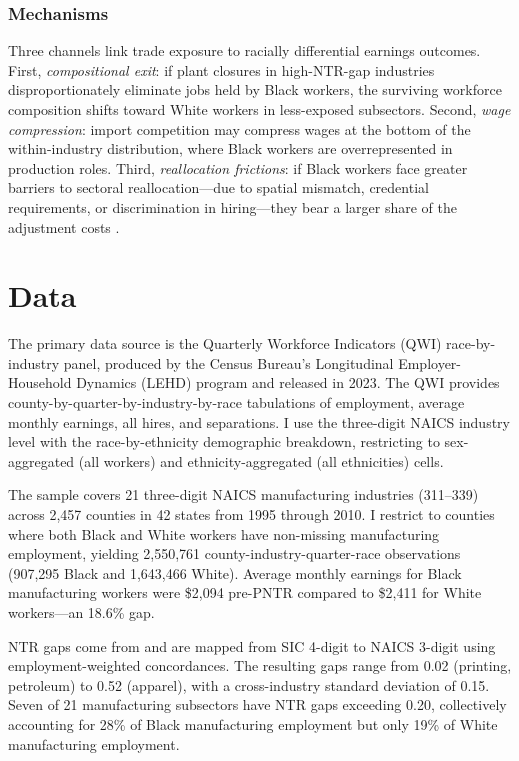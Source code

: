 \documentclass[12pt]{article}
\begin{document}
\subsubsection*{Mechanisms} Three channels link trade exposure to racially differential earnings outcomes. First, \textit{compositional exit}: if plant closures in high-NTR-gap industries disproportionately eliminate jobs held by Black workers, the surviving workforce composition shifts toward White workers in less-exposed subsectors. Second, \textit{wage compression}: import competition may compress wages at the bottom of the within-industry distribution, where Black workers are overrepresented in production roles. Third, \textit{reallocation frictions}: if Black workers face greater barriers to sectoral reallocation---due to spatial mismatch, credential requirements, or discrimination in hiring---they bear a larger share of the adjustment costs \citep{autor2014}.

\section{Data}

The primary data source is the Quarterly Workforce Indicators (QWI) race-by-industry panel, produced by the Census Bureau's Longitudinal Employer-Household Dynamics (LEHD) program and released in 2023. The QWI provides county-by-quarter-by-industry-by-race tabulations of employment, average monthly earnings, all hires, and separations. I use the three-digit NAICS industry level with the race-by-ethnicity demographic breakdown, restricting to sex-aggregated (all workers) and ethnicity-aggregated (all ethnicities) cells.

The sample covers 21 three-digit NAICS manufacturing industries (311--339) across 2,457 counties in 42 states from 1995 through 2010. I restrict to counties where both Black and White workers have non-missing manufacturing employment, yielding 2,550,761 county-industry-quarter-race observations (907,295 Black and 1,643,466 White). Average monthly earnings for Black manufacturing workers were \$2,094 pre-PNTR compared to \$2,411 for White workers---an 18.6\% gap.

NTR gaps come from \citet{pierce2016} and are mapped from SIC 4-digit to NAICS 3-digit using employment-weighted concordances. The resulting gaps range from 0.02 (printing, petroleum) to 0.52 (apparel), with a cross-industry standard deviation of 0.15. Seven of 21 manufacturing subsectors have NTR gaps exceeding 0.20, collectively accounting for 28\% of Black manufacturing employment but only 19\% of White manufacturing employment.
\end{document}
